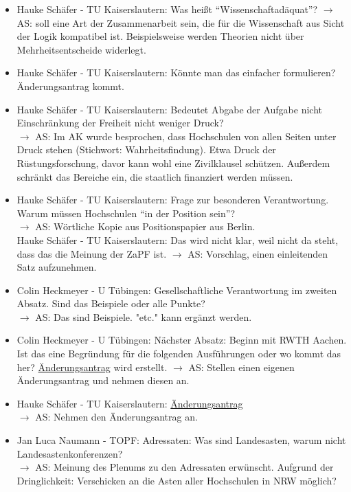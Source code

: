     \begin{itemize}
      \item Hauke Schäfer - TU Kaiserslautern:  Was heißt ``Wissenschaftadäquat''?
        $\rightarrow$ AS: soll eine Art der Zusammenarbeit sein, die für die Wissenschaft aus Sicht der Logik kompatibel ist. Beispielsweise werden Theorien nicht über Mehrheitsentscheide widerlegt.
      \item Hauke Schäfer - TU Kaiserslautern:  Könnte man das einfacher formulieren? Änderungsantrag kommt.
      \item Hauke Schäfer - TU Kaiserslautern:  Bedeutet Abgabe der Aufgabe nicht Einschränkung der Freiheit nicht weniger Druck? \\
        $\rightarrow$ AS: Im AK wurde besprochen, dass Hochschulen von allen Seiten unter Druck stehen (Stichwort: Wahrheitsfindung). Etwa Druck der Rüstungsforschung, davor kann wohl eine Zivilklausel schützen. Außerdem schränkt das Bereiche ein, die staatlich finanziert werden müssen.
      \item Hauke Schäfer - TU Kaiserslautern:  Frage zur besonderen Verantwortung. Warum müssen Hochschulen ``in der Position sein''? \\
        $\rightarrow$ AS: Wörtliche Kopie aus Positionspapier aus Berlin. \\
        Hauke Schäfer - TU Kaiserslautern:  Das wird nicht klar, weil nicht da steht, dass das die Meinung der ZaPF ist.
        $\rightarrow$ AS: Vorschlag, einen einleitenden Satz aufzunehmen.
      \item Colin Heckmeyer - U Tübingen:  Gesellschaftliche Verantwortung im zweiten Absatz. Sind das Beispiele oder alle Punkte? \\
        $\rightarrow$ AS: Das sind Beispiele. "etc." kann ergänzt werden.
      \item Colin Heckmeyer - U Tübingen:  Nächster Absatz: Beginn mit RWTH Aachen. Ist das eine Begründung für die folgenden Ausführungen oder wo kommt das her? \uline{Änderungsantrag} wird erstellt.
        $\rightarrow$ AS: Stellen einen eigenen Änderungsantrag und nehmen diesen an.
      \item Hauke Schäfer - TU Kaiserslautern:  \uline{Änderungsantrag} \\
        $\rightarrow$ AS: Nehmen den Änderungsantrag an.
      \item Jan Luca Naumann - TOPF:  Adressaten: Was sind Landesasten, warum nicht Landesastenkonferenzen? \\
        $\rightarrow$ AS: Meinung des Plenums zu den Adressaten erwünscht. Aufgrund der Dringlichkeit: Verschicken an die Asten aller Hochschulen in NRW möglich? \\

\end{itemize}
